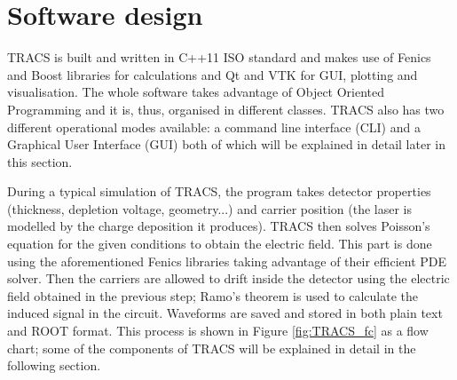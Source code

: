 \section{Software design} %
\label{sec:softDesign}

TRACS is built and written in C++11 ISO standard \cite{C++11} and makes use of Fenics \cite{Fenics} and Boost libraries \cite{Boost} for calculations and Qt \cite{Qt} and VTK \cite{VTK} for GUI, plotting and visualisation. The whole software takes advantage of Object Oriented Programming and it is, thus, organised in different classes. TRACS also has two different operational modes available: a command line interface (CLI) and a Graphical User Interface (GUI) both of which will be explained in detail later in this section.

During a typical simulation of TRACS, the program takes detector properties (thickness, depletion voltage, geometry...) and carrier position (the laser is modelled by the charge deposition it produces). TRACS then solves Poisson's equation for the given conditions to obtain the electric field. This part is done using the aforementioned Fenics libraries taking advantage of their efficient PDE solver. Then the carriers are allowed to drift inside the detector using the electric field obtained in the previous step; Ramo's theorem is used to calculate the induced signal in the circuit. Waveforms are saved and stored in both plain text and ROOT\cite{ROOT} format. This process is shown in Figure \ref{fig:TRACS_fc} as a flow chart; some of the components of TRACS will be explained in detail in the following section.

